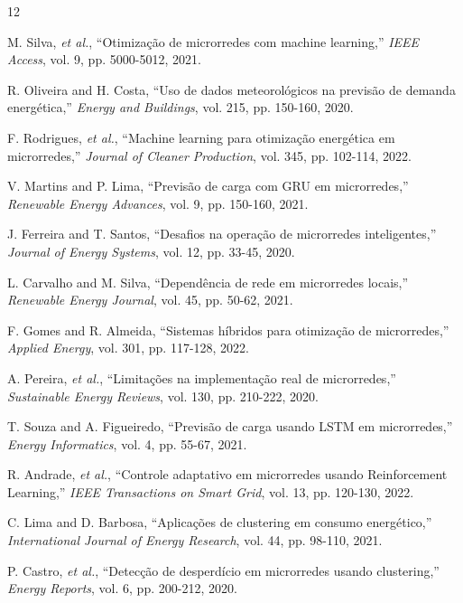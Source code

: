 \documentclass[conference]{IEEEtran}
\begin{document}
\begin{thebibliography}{12}

 M. Silva, \textit{et al.}, ``Otimização de microrredes com machine learning,'' \textit{IEEE Access}, vol. 9, pp. 5000-5012, 2021.

 R. Oliveira and H. Costa, ``Uso de dados meteorológicos na previsão de demanda energética,'' \textit{Energy and Buildings}, vol. 215, pp. 150-160, 2020.

 F. Rodrigues, \textit{et al.}, ``Machine learning para otimização energética em microrredes,'' \textit{Journal of Cleaner Production}, vol. 345, pp. 102-114, 2022.

 V. Martins and P. Lima, ``Previsão de carga com GRU em microrredes,'' \textit{Renewable Energy Advances}, vol. 9, pp. 150-160, 2021.

 J. Ferreira and T. Santos, ``Desafios na operação de microrredes inteligentes,'' \textit{Journal of Energy Systems}, vol. 12, pp. 33-45, 2020.

 L. Carvalho and M. Silva, ``Dependência de rede em microrredes locais,'' \textit{Renewable Energy Journal}, vol. 45, pp. 50-62, 2021.

 F. Gomes and R. Almeida, ``Sistemas híbridos para otimização de microrredes,'' \textit{Applied Energy}, vol. 301, pp. 117-128, 2022.

 A. Pereira, \textit{et al.}, ``Limitações na implementação real de microrredes,'' \textit{Sustainable Energy Reviews}, vol. 130, pp. 210-222, 2020.

 T. Souza and A. Figueiredo, ``Previsão de carga usando LSTM em microrredes,'' \textit{Energy Informatics}, vol. 4, pp. 55-67, 2021.

 R. Andrade, \textit{et al.}, ``Controle adaptativo em microrredes usando Reinforcement Learning,'' \textit{IEEE Transactions on Smart Grid}, vol. 13, pp. 120-130, 2022.

 C. Lima and D. Barbosa, ``Aplicações de clustering em consumo energético,'' \textit{International Journal of Energy Research}, vol. 44, pp. 98-110, 2021.

 P. Castro, \textit{et al.}, ``Detecção de desperdício em microrredes usando clustering,'' \textit{Energy Reports}, vol. 6, pp. 200-212, 2020.

\end{thebibliography}
\end{document}
